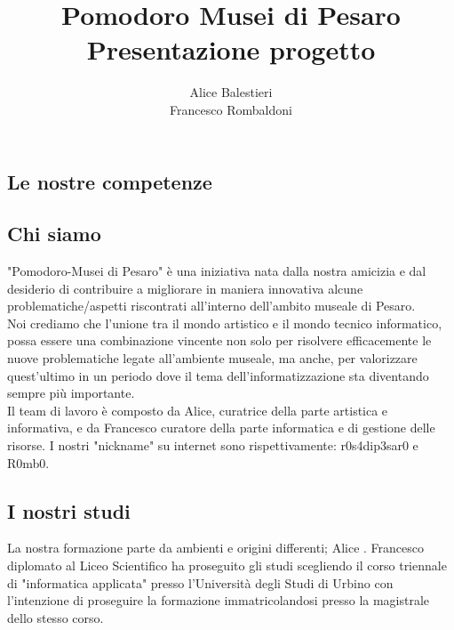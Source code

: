 \documentclass[hidelinks,12pt,a4paper]{article}
\begin{document}
	\begin{flushleft}
		
		\title{\textbf{Pomodoro Musei di Pesaro}\\\small{Presentazione progetto}}
		\author{Alice Balestieri\\ Francesco Rombaldoni}
		\date{}
		
		\maketitle
		
		\setcounter{page}{1}
		\newpage
		\tableofcontents
		\newpage
			
			\section{Le nostre competenze}
				\subsection{Chi siamo}
				"Pomodoro-Musei di Pesaro" è una iniziativa nata dalla nostra amicizia e dal desiderio di contribuire a migliorare in maniera innovativa alcune problematiche/aspetti riscontrati all'interno dell'ambito museale di Pesaro.\\
				Noi crediamo che l'unione tra il mondo artistico e il mondo tecnico informatico, possa essere una combinazione vincente non solo per risolvere efficacemente le nuove problematiche legate all'ambiente museale, ma anche, per valorizzare quest'ultimo in un periodo dove il tema dell'informatizzazione sta diventando sempre più importante.\\
				Il team di lavoro è composto da Alice, curatrice della parte artistica e informativa, e da Francesco curatore della parte informatica e di gestione delle risorse. I nostri "nickname" su internet sono rispettivamente: r0s4dip3sar0 e R0mb0. 
				
				\subsection{I nostri studi}
				La nostra formazione parte da ambienti e origini differenti; Alice
				 . Francesco diplomato al Liceo Scientifico ha proseguito gli studi scegliendo il corso triennale di "informatica applicata" presso l'Università degli Studi di Urbino con l'intenzione di proseguire la formazione immatricolandosi presso la magistrale dello stesso corso.  
				

\end{flushleft}
\end{document}

